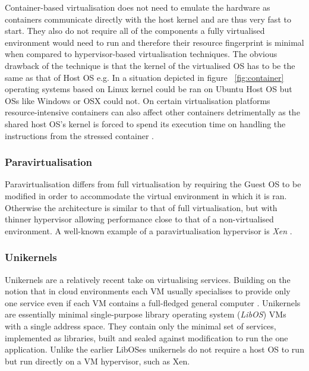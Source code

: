 
Container-based virtualisation does not need to emulate the hardware as containers communicate directly with the host kernel \cite{eder2016hypervisor} and are thus very fast to start. They also do not require all of the components a fully virtualised environment would need to run and therefore their resource fingerprint is minimal when compared to hypervisor-based virtualisation techniques. \linebreak
The obvious drawback of the technique is that the kernel of the virtualised OS has to be the same as that of Host OS e.g. In a situation depicted in figure ~\ref{fig:container} operating systems based on Linux kernel could be ran on Ubuntu Host OS but OSs like Windows or OSX could not. On certain virtualisation platforms resource-intensive containers can also affect other containers detrimentally as the shared host OS's kernel is forced to spend its execution time on handling the instructions from the stressed container \cite{Xaviercontainer}.


\subsubsection{Paravirtualisation}

Paravirtualisation differs from full virtualisation by requiring the Guest OS to be modified in order to accommodate the virtual environment in which it is ran. Otherwise the architecture is similar to that of full virtualisation, but with thinner hypervisor allowing performance close to that of a non-virtualised environment. A well-known example of a paravirtualisation hypervisor is \textit{Xen} \cite{xen}.

\subsubsection{Unikernels}

Unikernels are a relatively recent take on virtualising services. Building on the notion that in cloud environments each VM usually specialises to provide only one service even if each VM contains a full-fledged general computer \cite{unikernels}. Unikernels are essentially minimal single-purpose library operating system (\textit{LibOS})\cite{libos} VMs with a single address space. They contain only the minimal set of services, implemented as libraries, built and sealed against modification to run the one application. Unlike the earlier LibOSes unikernels do not require a host OS to run but run directly on a VM hypervisor, such as Xen.

